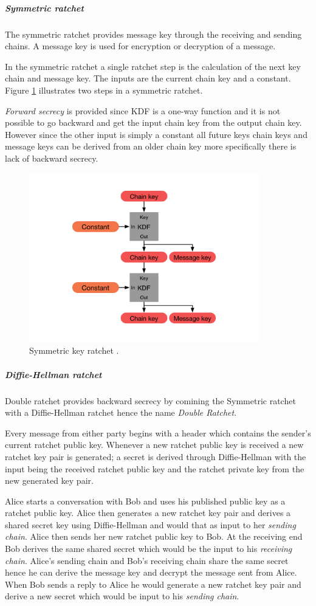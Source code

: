 \subparagraph{Symmetric ratchet}
The symmetric ratchet provides message key through the receiving and sending chains. A message key is used for encryption or decryption of a message.

In the symmetric ratchet a single ratchet step is the calculation of the next key chain and message key. The inputs are the current chain key and a constant. Figure \ref{fig:symkeyratchet} illustrates two steps in a symmetric ratchet.

\emph{Forward secrecy} is provided since KDF is a one-way function and it is not possible to go backward and get the input chain key from the output chain key. However since the other input is simply a constant all future keys chain keys and message keys can be derived from an older chain key more specifically there is lack of backward secrecy.


\begin{figure}[H]
	\centering
	\includegraphics[width=10cm]{figures/symmetrickeyratchet.png}
	\caption{Symmetric key ratchet \cite{doubleratchet}.}
	\label{fig:symkeyratchet}
\end{figure}


\newpage
\subparagraph{Diffie-Hellman ratchet}

Double ratchet provides backward secrecy by comining the Symmetric ratchet with a Diffie-Hellman ratchet hence the name \emph{Double Ratchet}.

Every message from either party begins with a header which contains the sender's current ratchet public key. Whenever a new ratchet public key is received a new ratchet key pair is generated; a secret is derived through Diffie-Hellman with the input being the received ratchet public key and the ratchet private key from the new generated key pair.

Alice starts a conversation with Bob and uses his published public key as a ratchet public key. Alice then generates a new ratchet key pair and derives a shared secret key using Diffie-Hellman and would that as input to her \emph{sending chain}. Alice then sends her new ratchet public key to Bob. At the receiving end Bob derives the same shared secret which would be the input to his \emph{receiving chain}. Alice's sending chain and Bob's receiving chain share the same secret hence he can derive the message key and decrypt the message sent from Alice. When Bob sends a reply to Alice he would generate a new ratchet key pair and derive a new secret which would be input to his \emph{sending chain}.

